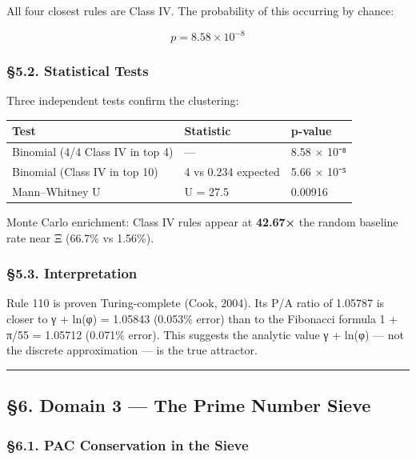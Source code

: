 \documentclass[
  11pt,
  a4paper]{article}
\begin{document}
All four closest rules are Class IV. The probability of this occurring
by chance:

\[p = 8.58 \times 10^{-8}\]

\subsubsection{§5.2. Statistical Tests}\label{statistical-tests}

Three independent tests confirm the clustering:

\begin{longtable}[]{@{}lll@{}}
\toprule\noalign{}
Test & Statistic & p-value \\
\midrule\noalign{}
\endhead
\bottomrule\noalign{}
\endlastfoot
Binomial (4/4 Class IV in top 4) & --- & 8.58 × 10⁻⁸ \\
Binomial (Class IV in top 10) & 4 vs 0.234 expected & 5.66 × 10⁻⁵ \\
Mann--Whitney U & U = 27.5 & 0.00916 \\
\end{longtable}

Monte Carlo enrichment: Class IV rules appear at \textbf{42.67×} the
random baseline rate near Ξ (66.7\% vs 1.56\%).

\subsubsection{§5.3. Interpretation}\label{interpretation}

Rule 110 is proven Turing-complete (Cook, 2004). Its P/A ratio of
1.05787 is closer to γ + ln(φ) = 1.05843 (0.053\% error) than to the
Fibonacci formula 1 + π/55 = 1.05712 (0.071\% error). This suggests the
analytic value γ + ln(φ) --- not the discrete approximation --- is the
true attractor.

\begin{center}\rule{0.5\linewidth}{0.5pt}\end{center}

\subsection{§6. Domain 3 --- The Prime Number
Sieve}\label{domain-3-the-prime-number-sieve}

\subsubsection{§6.1. PAC Conservation in the
Sieve}\label{pac-conservation-in-the-sieve}
\end{document}
